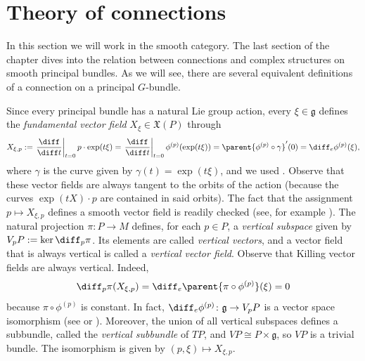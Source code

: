 \section{Theory of connections}
In this section we will work in the smooth category. The last section of the chapter dives into the relation between connections and complex structures on smooth principal bundles. As we will see, there are several equivalent definitions of a connection on a principal \(G\)-bundle. 

Since every principal bundle has a natural Lie group action, every \(\xi \in \mathfrak{g}\) defines the \textit{fundamental vector field} \(X_\xi \in \mathfrak{X}(P)\) through
\begin{equation} \label{def_Killing}
    X_{\xi,p}:=\left. \frac{\diff}{\diff t} \right|_{t=0} p \cdot \exp(t \xi)=\left. \frac{\diff}{\diff t} \right|_{t=0} \phi^{(p)}(\exp(t\xi))=\parent{\phi^{(p)}\circ \gamma}'(0)=\diff_e\phi^{(p)}(\xi),
\end{equation}
where \(\gamma\) is the curve given by \(\gamma(t)=\exp(t\xi)\), and we used \parencite[Cor. 3.25]{lee_introSM}. Observe that these vector fields are always tangent to the orbits of the action (because the curves \(\exp(tX)\cdot p\) are contained in said orbits). The fact that the assignment \(p \mapsto X_{\xi, p}\) defines a smooth vector field is readily checked (see, for example \parencite[Prop. 27.11]{tu2017differential}). The natural projection \(\pi \colon P \to M\) defines, for each \(p \in P\), a \textit{vertical subspace} given by \(V_pP:=\ker \diff_p\pi\). Its elements are called \textit{vertical vectors}, and a vector field that is always vertical is called a \textit{vertical vector field}. Observe that Killing vector fields are always vertical. Indeed,
\[
\diff_p\pi(X_{\xi,p})= \diff_e\parent{\pi \circ \phi^{(p)}}(\xi) = 0
\]
because \(\pi \circ \phi^{(p)}\) is constant. In fact, \(\diff_e \phi^{(p)}\colon \mathfrak{g} \to V_pP\) is a vector space isomorphism (see \parencite[Lemma 1.3.1]{Rudolph_2017pug} or \parencite[Prop. 27.18]{tu2017differential}). Moreover, the union of all vertical subspaces defines a subbundle, called the \textit{vertical subbundle} of \(TP\), and \(VP \cong P \times \mathfrak{g}\), so \(VP\) is a trivial bundle. The isomorphism is given by \((p, \xi) \mapsto X_{\xi, p}\).

